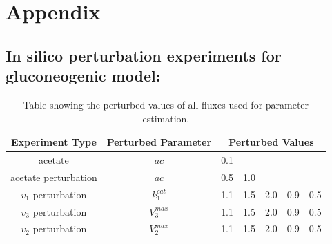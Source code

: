 \documentclass[10pt]{article}
\begin{document}

\section*{Appendix}
\subsection*{In silico perturbation experiments for gluconeogenic model:}
\begin{table}[!tbhp]
	\caption{Table showing the perturbed values of all fluxes used for parameter estimation.}
	\begin{center}				
		\begin{tabular}{ccccccc}
			\hline
			Experiment Type & Perturbed Parameter & \multicolumn{5}{c}{Perturbed Values}\\
			\hline
			acetate & $ac$ & \multicolumn{5}{l}{0.1}\\
			\hline
			acetate perturbation & $ac$ & 0.5 & 1.0 & & &\\
			\hline
			$v_1$ perturbation & $k_1^{cat}$ & 1.1 & 1.5 & 2.0 & 0.9 & 0.5\\
			\hline
			$v_3$ perturbation & $V_3^{max}$ & 1.1 & 1.5 & 2.0 & 0.9 & 0.5\\
			\hline
			$v_2$ perturbation & $V_2^{max}$ & 1.1 & 1.5 & 2.0 & 0.9 & 0.5\\
		\end{tabular}
	\end{center}	
	\label{tab:pval}
\end{table}



\printbibliography
\end{document}
